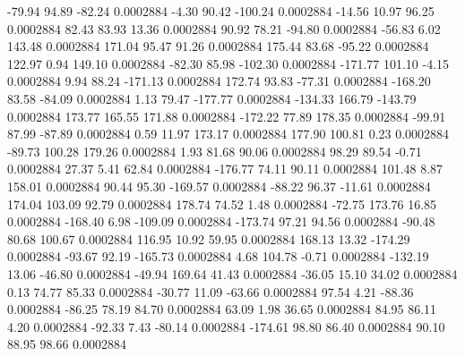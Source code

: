       -79.94       94.89      -82.24     0.0002884
       -4.30       90.42     -100.24     0.0002884
      -14.56       10.97       96.25     0.0002884
       82.43       83.93       13.36     0.0002884
       90.92       78.21      -94.80     0.0002884
      -56.83        6.02      143.48     0.0002884
      171.04       95.47       91.26     0.0002884
      175.44       83.68      -95.22     0.0002884
      122.97        0.94      149.10     0.0002884
      -82.30       85.98     -102.30     0.0002884
     -171.77      101.10       -4.15     0.0002884
        9.94       88.24     -171.13     0.0002884
      172.74       93.83      -77.31     0.0002884
     -168.20       83.58      -84.09     0.0002884
        1.13       79.47     -177.77     0.0002884
     -134.33      166.79     -143.79     0.0002884
      173.77      165.55      171.88     0.0002884
     -172.22       77.89      178.35     0.0002884
      -99.91       87.99      -87.89     0.0002884
        0.59       11.97      173.17     0.0002884
      177.90      100.81        0.23     0.0002884
      -89.73      100.28      179.26     0.0002884
        1.93       81.68       90.06     0.0002884
       98.29       89.54       -0.71     0.0002884
       27.37        5.41       62.84     0.0002884
     -176.77       74.11       90.11     0.0002884
      101.48        8.87      158.01     0.0002884
       90.44       95.30     -169.57     0.0002884
      -88.22       96.37      -11.61     0.0002884
      174.04      103.09       92.79     0.0002884
      178.74       74.52        1.48     0.0002884
      -72.75      173.76       16.85     0.0002884
     -168.40        6.98     -109.09     0.0002884
     -173.74       97.21       94.56     0.0002884
      -90.48       80.68      100.67     0.0002884
      116.95       10.92       59.95     0.0002884
      168.13       13.32     -174.29     0.0002884
      -93.67       92.19     -165.73     0.0002884
        4.68      104.78       -0.71     0.0002884
     -132.19       13.06      -46.80     0.0002884
      -49.94      169.64       41.43     0.0002884
      -36.05       15.10       34.02     0.0002884
        0.13       74.77       85.33     0.0002884
      -30.77       11.09      -63.66     0.0002884
       97.54        4.21      -88.36     0.0002884
      -86.25       78.19       84.70     0.0002884
       63.09        1.98       36.65     0.0002884
       84.95       86.11        4.20     0.0002884
      -92.33        7.43      -80.14     0.0002884
     -174.61       98.80       86.40     0.0002884
       90.10       88.95       98.66     0.0002884
